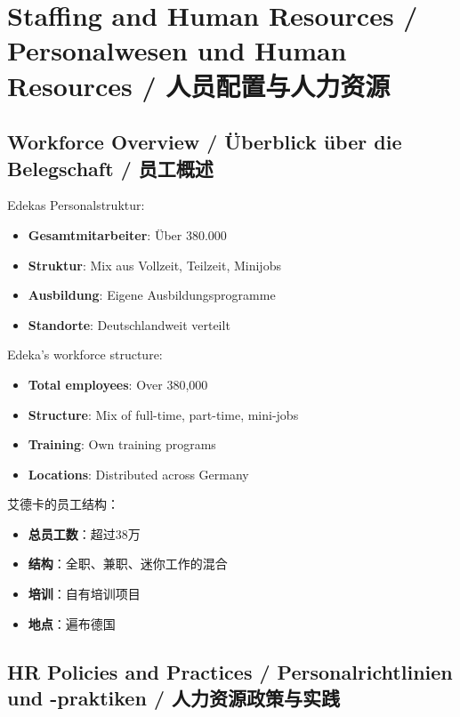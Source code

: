 \chapter{Staffing and Human Resources / Personalwesen und Human Resources / 人员配置与人力资源}

\section{Workforce Overview / Überblick über die Belegschaft / 员工概述}

\begin{otherlanguage}{ngerman}
Edekas Personalstruktur:
\begin{itemize}
    \item \textbf{Gesamtmitarbeiter}: Über 380.000
    \item \textbf{Struktur}: Mix aus Vollzeit, Teilzeit, Minijobs
    \item \textbf{Ausbildung}: Eigene Ausbildungsprogramme
    \item \textbf{Standorte}: Deutschlandweit verteilt
\end{itemize}
\end{otherlanguage}

Edeka's workforce structure:
\begin{itemize}
    \item \textbf{Total employees}: Over 380,000
    \item \textbf{Structure}: Mix of full-time, part-time, mini-jobs
    \item \textbf{Training}: Own training programs
    \item \textbf{Locations}: Distributed across Germany
\end{itemize}

艾德卡的员工结构：
\begin{itemize}
    \item \textbf{总员工数}：超过38万
    \item \textbf{结构}：全职、兼职、迷你工作的混合
    \item \textbf{培训}：自有培训项目
    \item \textbf{地点}：遍布德国
\end{itemize}

\section{HR Policies and Practices / Personalrichtlinien und -praktiken / 人力资源政策与实践}

